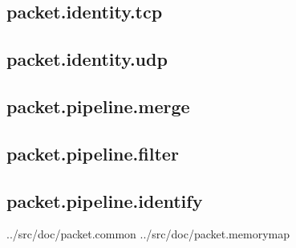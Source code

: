 \documentclass[10pt,a4paper,notitlepage]{report}
\begin{document}
\subsection{packet.identity.tcp}
\subsection{packet.identity.udp}

\subsection{packet.pipeline.merge}
\subsection{packet.pipeline.filter}
\subsection{packet.pipeline.identify}

../src/doc/packet.common
../src/doc/packet.memorymap
\end{document}
